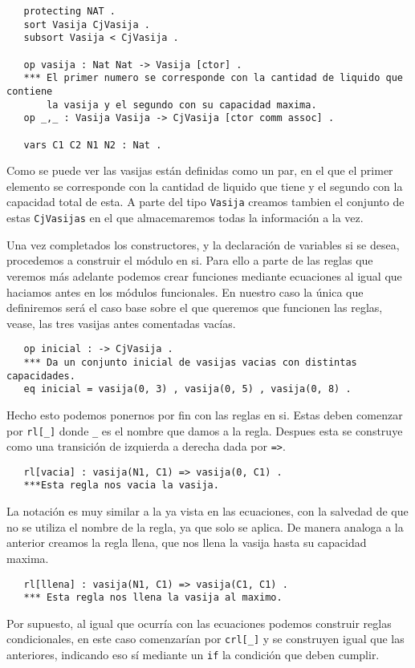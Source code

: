 {\codesize
\begin{verbatim}
   protecting NAT .
   sort Vasija CjVasija .
   subsort Vasija < CjVasija .

   op vasija : Nat Nat -> Vasija [ctor] .
   *** El primer numero se corresponde con la cantidad de liquido que contiene 
       la vasija y el segundo con su capacidad maxima.
   op _,_ : Vasija Vasija -> CjVasija [ctor comm assoc] .

   vars C1 C2 N1 N2 : Nat .
\end{verbatim}
}
Como se puede ver las vasijas están definidas como un par, en el que el primer elemento se corresponde con la cantidad de liquido que tiene y el segundo con la capacidad total de esta. A parte del tipo \texttt{Vasija} creamos tambien el conjunto de estas \texttt{CjVasijas} en el que almacemaremos todas la información a la vez.\par 

Una vez completados los constructores, y la declaración de variables si se desea, procedemos a construir el módulo en si. Para ello a parte de las reglas que veremos más adelante podemos crear funciones mediante ecuaciones al igual que haciamos antes en los módulos funcionales. En nuestro caso la única que definiremos será el caso base sobre el que queremos que funcionen las reglas, vease, las tres vasijas antes comentadas vacías.\par

{\codesize
\begin{verbatim}
   op inicial : -> CjVasija .
   *** Da un conjunto inicial de vasijas vacias con distintas capacidades.
   eq inicial = vasija(0, 3) , vasija(0, 5) , vasija(0, 8) .
\end{verbatim}
}

Hecho esto podemos ponernos por fin con las reglas en si. Estas deben comenzar por \verb"rl[_]" donde \verb"_" es el nombre que damos a la regla. Despues esta se construye como una transición de izquierda a derecha dada por \verb"=>".\par

{\codesize
\begin{verbatim}
   rl[vacia] : vasija(N1, C1) => vasija(0, C1) .
   ***Esta regla nos vacia la vasija.
\end{verbatim}
}
La notación es muy similar a la ya vista en las ecuaciones, con la salvedad de que no se utiliza el nombre de la regla, ya que solo se aplica. De manera analoga a la anterior creamos la regla llena, que nos llena la vasija hasta su capacidad maxima.\par
{\codesize
\begin{verbatim}
   rl[llena] : vasija(N1, C1) => vasija(C1, C1) .
   *** Esta regla nos llena la vasija al maximo.
\end{verbatim}
}
Por supuesto, al igual que ocurría con las ecuaciones podemos construir reglas condicionales, en este caso comenzarían por \verb"crl[_]" y se construyen igual que las anteriores, indicando eso sí mediante un \texttt{if} la condición que deben cumplir.\par

